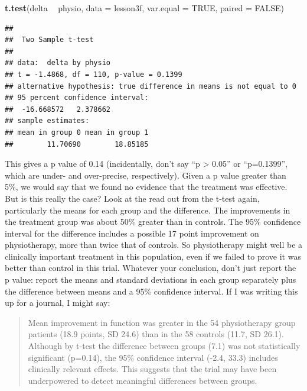 \documentclass[]{book}
\newenvironment{Shaded}{\begin{snugshade}}{\end{snugshade}}
\newcommand{\DataTypeTok}[1]{\textcolor[rgb]{0.13,0.29,0.53}{#1}}
\newcommand{\KeywordTok}[1]{\textcolor[rgb]{0.13,0.29,0.53}{\textbf{#1}}}
\newcommand{\NormalTok}[1]{#1}
\newcommand{\OperatorTok}[1]{\textcolor[rgb]{0.81,0.36,0.00}{\textbf{#1}}}
\newcommand{\OtherTok}[1]{\textcolor[rgb]{0.56,0.35,0.01}{#1}}
\newcommand{\StringTok}[1]{\textcolor[rgb]{0.31,0.60,0.02}{#1}}
\begin{document}
\begin{Shaded}
\begin{Highlighting}[]
\KeywordTok{t.test}\NormalTok{(delta }\OperatorTok{~}\StringTok{ }\NormalTok{physio, }\DataTypeTok{data =}\NormalTok{ lesson3f, }\DataTypeTok{var.equal =} \OtherTok{TRUE}\NormalTok{, }\DataTypeTok{paired =} \OtherTok{FALSE}\NormalTok{)}
\end{Highlighting}
\end{Shaded}

\begin{verbatim}
## 
##  Two Sample t-test
## 
## data:  delta by physio
## t = -1.4868, df = 110, p-value = 0.1399
## alternative hypothesis: true difference in means is not equal to 0
## 95 percent confidence interval:
##  -16.668572   2.378662
## sample estimates:
## mean in group 0 mean in group 1 
##        11.70690        18.85185
\end{verbatim}

This gives a p value of 0.14 (incidentally, don't say ``p \textgreater{}
0.05'' or ``p=0.1399'', which are under- and over-precise,
respectively). Given a p value greater than 5\%, we would say that we
found no evidence that the treatment was effective. But is this really
the case? Look at the read out from the t-test again, particularly the
means for each group and the difference. The improvements in the
treatment group was about 50\% greater than in controls. The 95\%
confidence interval for the difference includes a possible 17 point
improvement on physiotherapy, more than twice that of controls. So
physiotherapy might well be a clinically important treatment in this
population, even if we failed to prove it was better than control in
this trial. Whatever your conclusion, don't just report the p value:
report the means and standard deviations in each group separately plus
the difference between means and a 95\% confidence interval. If I was
writing this up for a journal, I might say:

\begin{quote}
Mean improvement in function was greater in the 54 physiotherapy group
patients (18.9 points, SD 24.6) than in the 58 controls (11.7, SD 26.1).
Although by t-test the difference between groups (7.1) was not
statistically significant (p=0.14), the 95\% confidence interval (-2.4,
33.3) includes clinically relevant effects. This suggests that the trial
may have been underpowered to detect meaningful differences between
groups.
\end{quote}
\end{document}
